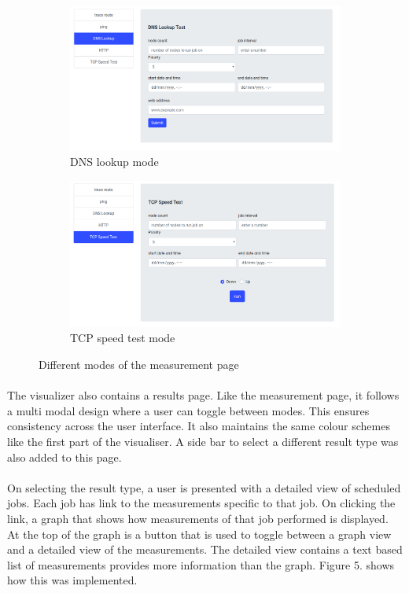\begin{figure}
\begin{subfigure}{.5\textwidth}
	\centering
	\includegraphics[width=.8\linewidth]{images/dlookup}
	\caption{DNS lookup mode}
	\label{fig:sfig4}
\end{subfigure}
\begin{subfigure}{.5\textwidth}
	\centering
	\includegraphics[width=.8\linewidth]{images/tcp}
	\caption{TCP speed test mode}
	\label{fig:sfig5}
\end{subfigure}
	\caption{Different modes of the measurement page}
	\label{fig:fig}
\end{figure}

\paragraph{}
The visualizer also contains a results page. Like the measurement page, it follows a multi modal design where a user can toggle between modes. This ensures consistency across the user interface\cite{goldenrules}. It also maintains the same colour schemes like the first part of the visualiser. A side bar to select a different result type was also added to this page.
\paragraph{}
On selecting the result type, a user is presented with a detailed view of scheduled jobs. Each job has link to the measurements specific to that job. On clicking the link, a graph  that shows how measurements of that job performed is displayed. At the top of the graph is a button that is used to toggle between a graph view and a detailed view of the measurements. The detailed view contains a text based list of measurements provides more information than the graph. Figure 5. shows how this was implemented. 
